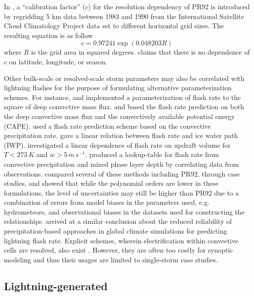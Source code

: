 	In \citet{Price:1994fk}, a ``calibration factor'' ($c$) for the resolution dependency of PR92 is introduced by regridding 5 km data between 1983 and 1990 from the International Satellite Cloud Climatology Project data set \citep[ISCCP;][]{Rossow:1991aa} to different horizontal grid sizes. The resulting equation is as follow
	\begin{equation}\label{eqn:pr94-calib}
		c = 0.97241\exp(0.048203R)
	\end{equation}
	where $R$ is the grid area in squared degrees. \citet{Price:1994fk} claims that there is no dependence of $c$ on latitude, longitude, or season.

	Other bulk-scale or resolved-scale storm parameters may also be correlated with lightning flashes for the purpose of formulating alternative parameterization schemes. For instance, \citet{Allen:2002fk} and\citet{Allen:2010fk} implemented a parameterization of flash rate to the square of deep convective mass flux. \citet{Zhao:2009kx} and \citet{Choi:2005uq} based the flash rate prediction on both the deep convective mass flux and the convectively available potential energy (CAPE). \citet{Allen:2012fk} used a flash rate prediction scheme based on the convective precipitation rate. \citet{Petersen:2005fk} gave a linear relation between flash rate and ice water path (IWP). \citet{Deierling:2008uq} investigated a linear dependence of flash rate on updraft volume for $T<273\,\unit{K}$ and $w>5\,\unit{m\,s^{-1}}$. \citet{Hansen:2012aa} produced a lookup-table for flash rate from convective precipitation and mixed phase layer depth by correlating data from observations. \citet{Barthe:2010uq} compared several of these methods including PR92, through case studies, and showed that while the polynomial orders are lower in these formulations, the level of uncertainties may still be higher than PR92 due to a combination of errors from model biases in the parameters used, e.g. hydrometeors, and observational biases in the datasets used for constructing the relationships. \citet{Futyan:2007fk} arrived at a similar conclusion about the reduced reliability of precipitation-based approaches in global climate simulations for predicting lightning flash rate. Explicit schemes, wherein electrification within convective cells are resolved, also exist \citep[e.g.][]{Barthe:2005zr,Zhang:2003tp}. However, they are often too costly for synoptic modeling and thus their usages are limited to single-storm case studies.

\subsection{Lightning-generated } \label{ssec:intro/lightning/lnox}


